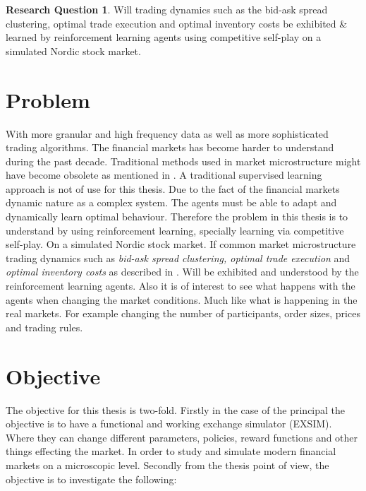 \documentclass{kththesis}
\theoremstyle{definition}
\newtheorem{RQ}{Research Question}[section]
\begin{document}
\begin{RQ}
Will trading dynamics such as the bid-ask spread clustering, optimal trade execution and optimal inventory costs be exhibited \& learned by reinforcement learning agents using competitive self-play on a simulated Nordic stock market.
\end{RQ}

\section{Problem}
With more granular and high frequency data as well as more sophisticated trading algorithms. The financial markets has become harder to understand during the past decade. Traditional methods used in market microstructure might have become obsolete as mentioned in \textcite{o2015high}. A traditional supervised learning approach is not of use for this thesis. Due to the fact of the financial markets dynamic nature as a complex system. The agents must be able to adapt and dynamically learn optimal behaviour.  Therefore the problem in this thesis is to understand by using reinforcement learning, specially learning via competitive self-play. On a simulated Nordic stock market. 
\newline
\newline
If common market microstructure trading dynamics such as \textit{bid-ask spread clustering, optimal trade execution} and \textit{optimal inventory costs} as described in \textcite{o1995market}. Will be exhibited and understood by the reinforcement learning agents. Also it is of interest to see what happens with the agents when changing the market conditions. Much like what is happening in the real markets. For example changing the number of participants, order sizes, prices and trading rules.



\section{Objective}
The objective for this thesis is two-fold. Firstly in the case of the principal the objective is to have a functional and working exchange simulator (EXSIM). Where they can change different parameters, policies, reward functions and other things effecting the market. In order to study and simulate modern financial markets on a microscopic level. Secondly from the thesis point of view, the objective is to investigate the following:
\end{document}
